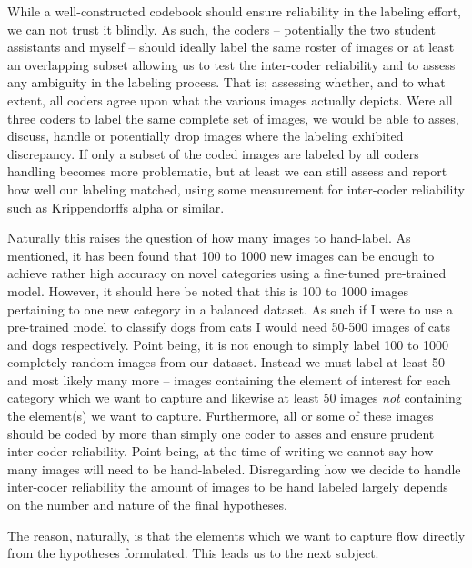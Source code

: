 \documentclass[a4paper]{article}
\begin{document}
While a well-constructed codebook should ensure reliability in the labeling effort, we can not trust it blindly. As such, the coders -- potentially the two student assistants and myself -- should ideally label the same roster of images or at least an overlapping subset allowing us to test the inter-coder reliability and to assess any ambiguity in the labeling process. That is; assessing whether, and to what extent, all coders agree upon what the various images actually depicts. Were all three coders to label the same complete set of images, we would be able to asses, discuss, handle or potentially drop images where the labeling exhibited discrepancy. If only a subset of the coded images are labeled by all coders handling becomes more problematic, but at least we can still assess and report how well our labeling matched, using some measurement for inter-coder reliability such as Krippendorffs alpha or similar. 

Naturally this raises the question of how many images to hand-label. As mentioned, it has been found that 100 to 1000 new images can be enough to achieve rather high accuracy on novel categories using a fine-tuned pre-trained model. However, it should here be noted that this is 100 to 1000 images pertaining to one new category in a balanced dataset. As such if I were to use a pre-trained model to classify dogs from cats I would need 50-500 images of cats and dogs respectively. Point being, it is not enough to simply label 100 to 1000 completely random images from our dataset. Instead we must label at least 50 -- and most likely many more -- images containing the element of interest for each category which we want to capture and likewise at least 50 images \emph{not} containing the element(s) we want to capture. Furthermore, all or some of these images should be coded by more than simply one coder to asses and ensure prudent inter-coder reliability. Point being, at the time of writing we cannot say how many images will need to be hand-labeled. Disregarding how we decide to handle inter-coder reliability the amount of images to be hand labeled largely depends on the number and nature of the final hypotheses.\par




The reason, naturally, is that the elements which we want to capture flow directly from the hypotheses formulated. This leads us to the next subject.\par %
\end{document}
